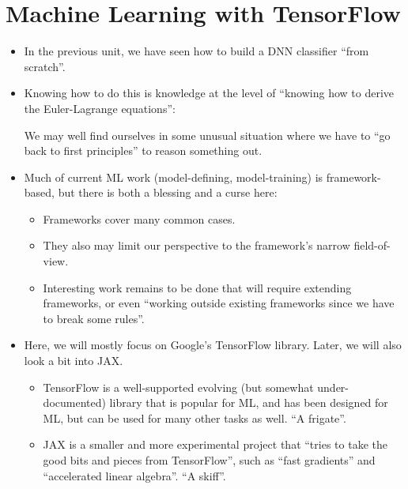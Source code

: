 \documentclass[11pt]{article}
\providecommand{\tightlist}{%
      \setlength{\itemsep}{0pt}\setlength{\parskip}{0pt}}
\begin{document}
    
    
    

    
    
    
    

    
    \hypertarget{machine-learning-with-tensorflow}{%
\section{Machine Learning with
TensorFlow}\label{machine-learning-with-tensorflow}}

\begin{itemize}
\item
  In the previous unit, we have seen how to build a DNN classifier
  ``from scratch''.
\item
  Knowing how to do this is knowledge at the level of ``knowing how to
  derive the Euler-Lagrange equations'':

  We may well find ourselves in some unusual situation where we have to
  ``go back to first principles'' to reason something out.
\item
  Much of current ML work (model-defining, model-training) is
  framework-based, but there is both a blessing and a curse here:

  \begin{itemize}
  \tightlist
  \item
    Frameworks cover many common cases.
  \item
    They also may limit our perspective to the framework's narrow
    field-of-view.
  \item
    Interesting work remains to be done that will require extending
    frameworks, or even ``working outside existing frameworks since we
    have to break some rules''.
  \end{itemize}
\item
  Here, we will mostly focus on Google's TensorFlow library. Later, we
  will also look a bit into JAX.

  \begin{itemize}
  \tightlist
  \item
    TensorFlow is a well-supported evolving (but somewhat
    under-documented) library that is popular for ML, and has been
    designed for ML, but can be used for many other tasks as well. ``A
    frigate''.
  \item
    JAX is a smaller and more experimental project that ``tries to take
    the good bits and pieces from TensorFlow'', such as ``fast
    gradients'' and ``accelerated linear algebra''. ``A skiff''.
  \end{itemize}
\end{itemize}
\end{document}
